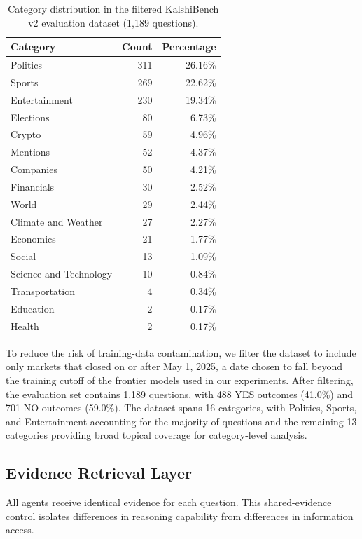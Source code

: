 \begin{table}[t]
\centering
\caption{Category distribution in the filtered KalshiBench v2 evaluation dataset (1,189 questions).}
\label{tab:category-distribution}
\begin{tabular}{lrr}
\toprule
\textbf{Category} & \textbf{Count} & \textbf{Percentage} \\
\midrule
Politics & 311 & 26.16\% \\
Sports & 269 & 22.62\% \\
Entertainment & 230 & 19.34\% \\
Elections & 80 & 6.73\% \\
Crypto & 59 & 4.96\% \\
Mentions & 52 & 4.37\% \\
Companies & 50 & 4.21\% \\
Financials & 30 & 2.52\% \\
World & 29 & 2.44\% \\
Climate and Weather & 27 & 2.27\% \\
Economics & 21 & 1.77\% \\
Social & 13 & 1.09\% \\
Science and Technology & 10 & 0.84\% \\
Transportation & 4 & 0.34\% \\
Education & 2 & 0.17\% \\
Health & 2 & 0.17\% \\
\bottomrule
\end{tabular}
\end{table}

To reduce the risk of training-data contamination, we filter the dataset to include only markets that closed on or after May 1, 2025, a date chosen to fall beyond the training cutoff of the frontier models used in our experiments. After filtering, the evaluation set contains 1,189 questions, with 488 YES outcomes (41.0\%) and 701 NO outcomes (59.0\%). The dataset spans 16 categories, with Politics, Sports, and Entertainment accounting for the majority of questions and the remaining 13 categories providing broad topical coverage for category-level analysis.

\subsection{Evidence Retrieval Layer}

All agents receive identical evidence for each question. This shared-evidence control isolates differences in reasoning capability from differences in information access.

